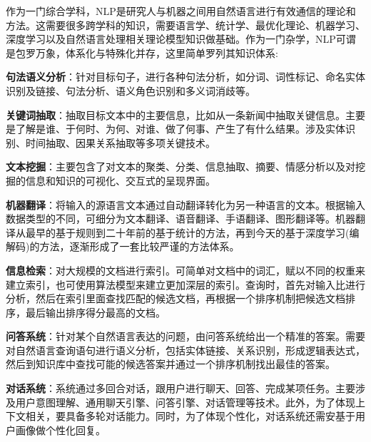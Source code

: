 \documentclass[UTF8]{ctexart}
\begin{document}
作为一门综合学科，NLP是研究人与机器之间用自然语言进行有效通信的理论和方法。这需要很多跨学科的知识，需要语言学、统计学、最优化理论、机器学习、深度学习以及自然语言处理相关理论模型知识做基础。作为一门杂学，NLP可谓是包罗万象，体系化与特殊化并存，这里简单罗列其知识体系:
\label{definitions}
\begin{enumerate}
\begin{item}
	\textbf{句法语义分析}：针对目标句子，进行各种句法分析，如分词、词性标记、命名实体识别及链接、句法分析、语义角色识别和多义词消歧等。
\end{item}
\begin{item}
	\textbf{关键词抽取}：抽取目标文本中的主要信息，比如从一条新闻中抽取关键信息。主要是了解是谁、于何时、为何、对谁、做了何事、产生了有什么结果。涉及实体识别、时间抽取、因果关系抽取等多项关键技术。
\end{item}

\begin{item}
	\textbf{文本挖掘}：主要包含了对文本的聚类、分类、信息抽取、摘要、情感分析以及对挖掘的信息和知识的可视化、交互式的呈现界面。
\end{item}
\begin{item}
	\textbf{机器翻译}：将输入的源语言文本通过自动翻译转化为另一种语言的文本。根据输入数据类型的不同，可细分为文本翻译、语音翻译、手语翻译、图形翻译等。机器翻译从最早的基于规则到二十年前的基于统计的方法，再到今天的基于深度学习(编解码)的方法，逐渐形成了一套比较严谨的方法体系。
\end{item}
\begin{item}
	\textbf{信息检索}：对大规模的文档进行索引。可简单对文档中的词汇，赋以不同的权重来建立索引，也可使用算法模型来建立更加深层的索引。查询时，首先对输入比进行分析，然后在索引里面查找匹配的候选文档，再根据一个排序机制把候选文档排序，最后输出排序得分最高的文档。
\end{item}
\begin{item}
\textbf{问答系统}：针对某个自然语言表达的问题，由问答系统给出一个精准的答案。需要对自然语言查询语句进行语义分析，包括实体链接、关系识别，形成逻辑表达式，然后到知识库中查找可能的候选答案并通过一个排序机制找出最佳的答案。
\end{item}

\begin{item}
\textbf{对话系统}：系统通过多回合对话，跟用户进行聊天、回答、完成某项任务。主要涉及用户意图理解、通用聊天引擎、问答引擎、对话管理等技术。此外，为了体现上下文相关，要具备多轮对话能力。同时，为了体现个性化，对话系统还需安基于用户画像做个性化回复。
\end{item}
\end{enumerate}
\end{document}
